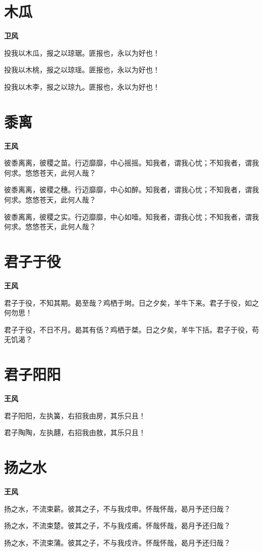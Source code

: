\documentclass[12pt,a4paper]{ctexbook}
\begin{document}
\section{木瓜}
\textbf{卫风}\par\vspace{0.5em}
投我以木瓜，报之以琼琚。匪报也，永以为好也！\par
投我以木桃，报之以琼瑶。匪报也，永以为好也！\par
投我以木李，报之以琼九。匪报也，永以为好也！\par

\section{黍离}
\textbf{王风}\par\vspace{0.5em}
彼黍离离，彼稷之苗。行迈靡靡，中心摇摇。知我者，谓我心忧；不知我者，谓我何求。悠悠苍天，此何人哉？\par
彼黍离离，彼稷之穗。行迈靡靡，中心如醉。知我者，谓我心忧；不知我者，谓我何求。悠悠苍天，此何人哉？\par
彼黍离离，彼稷之实。行迈靡靡，中心如噎。知我者，谓我心忧；不知我者，谓我何求。悠悠苍天，此何人哉？\par

\section{君子于役}
\textbf{王风}\par\vspace{0.5em}
君子于役，不知其期。曷至哉？鸡栖于埘。日之夕矣，羊牛下来。君子于役，如之何勿思！\par
君子于役，不日不月。曷其有佸？鸡栖于桀。日之夕矣，羊牛下括。君子于役，苟无饥渴？\par

\section{君子阳阳}
\textbf{王风}\par\vspace{0.5em}
君子阳阳，左执簧，右招我由房，其乐只且！\par
君子陶陶，左执翿，右招我由敖，其乐只且！\par

\section{扬之水}
\textbf{王风}\par\vspace{0.5em}
扬之水，不流束薪。彼其之子，不与我戍申。怀哉怀哉，曷月予还归哉？\par
扬之水，不流束楚。彼其之子，不与我戍甫。怀哉怀哉，曷月予还归哉？\par
扬之水，不流束蒲。彼其之子，不与我戍许。怀哉怀哉，曷月予还归哉？\par
\end{document}
